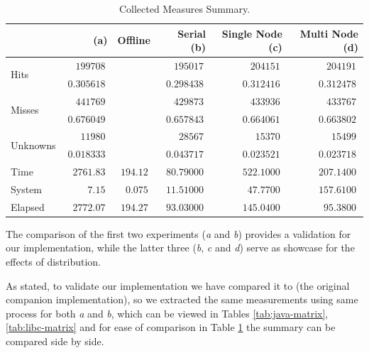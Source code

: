 \begin{table}[hbt]
\begin{center}
  \caption{Collected Measures Summary.}
  \label{tab:exper-summary}
  \newcommand{\mr}[1]{\multirow{2}{*}{#1}}
  \begin{tabular}{l|r|r|r|r|r}
                    &  (a)  & Offline       & Serial (b)      & Single Node (c) & Multi Node (d)  \\\hline
    \mr{Hits}       & $\ 199708\ $   &               & $\ 195017\ $    & $\ 204151\ $    & $\ 204191\ $    \\
                    & $\ 0.305618\ $ &               & $\ 0.298438\ $  & $\ 0.312416\ $  & $\ 0.312478\ $  \\
    \hline
    \mr{Misses}     & $\ 441769\ $   &               & $\ 429873\ $    & $\ 433936\ $    & $\ 433767\ $    \\
                    & $\ 0.676049\ $ &               & $\ 0.657843\ $  & $\ 0.664061\ $  & $\ 0.663802\ $  \\
    \hline
    \mr{Unknowns}   & $\ 11980\ $    &               & $\ 28567\ $     & $\ 15370\ $     & $\ 15499\ $     \\
                    & $\ 0.018333\ $ &               & $\ 0.043717\ $  & $\ 0.023521\ $  & $\ 0.023718\ $  \\
    \hline
    Time            & $\ 2761.83\ $  & $\ 194.12\ $  & $\ 80.79000\ $  & $\ 522.1000\ $  & $\ 207.1400\ $  \\\hline
    System          & $\ 7.15\ $     & $\  0.075\ $  & $\ 11.51000\ $  & $\  47.7700\ $  & $\ 157.6100\ $  \\\hline
    Elapsed         & $\ 2772.07\ $  & $\ 194.27\ $  & $\ 93.03000\ $  & $\ 145.0400\ $  & $\  95.3800\ $  
  \end{tabular}
\end{center}
\end{table}

The comparison of the first two experiments (\emph{a} and \emph{b}) provides a
validation for our implementation, while the latter three (\emph{b}, \emph{c}
and \emph{d}) serve as showcase for the effects of distribution.

As stated, to validate our implementation we have compared it to 
(the original \minas companion implementation), so we extracted the same measurements
using same process for both \emph{a} and \emph{b}, which can be viewed in
Tables \ref{tab:java-matrix}, \ref{tab:libc-matrix} and for ease of comparison
in Table \ref{tab:exper-summary} the summary can be compared side by side.

